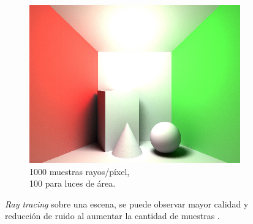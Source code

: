 \begin{figure}[H]
	\begin{subfigure}{0.33\textwidth}
		\centering
		\includegraphics[width=.98\linewidth]{media/ray_1000s.jpg}
		\captionsetup{width=0.98\textwidth, justification=centering}
		\caption*{1000 muestras rayos/píxel,\\ 100 para luces de área.}
	\end{subfigure}
	\caption{\emph{Ray tracing} sobre una escena, se puede observar mayor calidad y reducción de ruido al aumentar la cantidad de muestras \cite{locdoraytracing}.}
	\label{fig:ray_tracing_nsamples}
\end{figure}